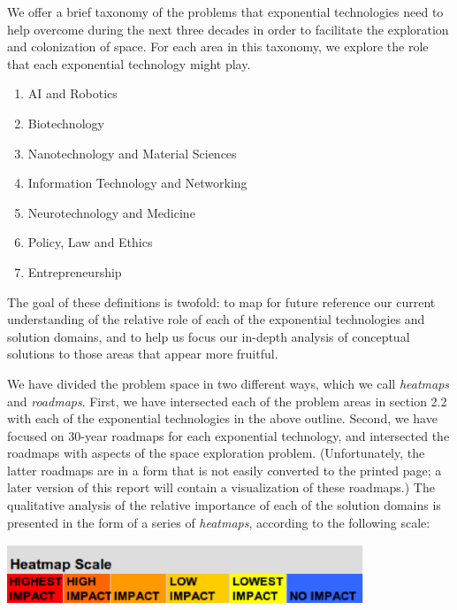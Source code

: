 \documentclass[letter,11pt]{article}
\begin{document}
We offer a brief taxonomy of the problems that exponential technologies need to
help overcome during the next three decades in order to facilitate the
exploration and colonization of space. For each area in this taxonomy, we
explore the role that each exponential technology might play.

\begin{enumerate}
	\item AI and Robotics \item   Biotechnology \item  Nanotechnology and Material Sciences \item  Information Technology and Networking \item  Neurotechnology and Medicine \item  Policy, Law and Ethics \item Entrepreneurship 
\end{enumerate}

The goal of these definitions is twofold: to map for future reference
our current understanding of the relative role of each of the
exponential technologies and solution domains, and to help us focus our
in-depth analysis of conceptual solutions to those areas that appear
more fruitful.

We have divided the problem space in two different ways, which we call {\em heatmaps} and {\em roadmaps}. First, we have
intersected each of the problem areas in section 2.2 with each of the
exponential technologies in the above outline. Second, we have focused on
30-year roadmaps for each exponential technology, and intersected the roadmaps
with aspects of the space exploration problem. (Unfortunately, the latter
roadmaps are in a form that is not easily converted to the printed page; a
later version of this report will contain a visualization of these roadmaps.)
The qualitative analysis of the relative importance of each of the solution
domains is presented in the form of a series of \emph{heatmaps}, according to
the following scale:\newline

\includegraphics[width=4.2in]{Heatmapscale}
\newline

\newpage
\end{document}
